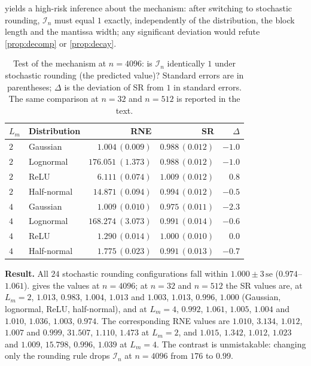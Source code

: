 \documentclass[twocolumn,review,hidelinks,oneeqnum,onetabnum,onefignum,onethmnum]{siamart251216}
\begin{document}
 yields a high-risk inference about the mechanism: after switching
to stochastic rounding, $\mathcal I_n$ must equal $1$ exactly, independently of
the distribution, the block length and the mantissa width; any significant
deviation would refute \cref{prop:decomp} or \cref{prop:decay}.

\begin{table}[!tb]
\centering
\caption{Test of the mechanism at $n=4096$: is $\mathcal I_n$ identically $1$
under stochastic rounding (the predicted value)? Standard errors are in
parentheses; $\Delta$ is the deviation of SR from $1$ in standard errors. The
same comparison at $n=32$ and $n=512$ is reported in the text.}
\label{tab:srfull}
\setlength{\tabcolsep}{4pt}
\footnotesize
\begin{tabular}{@{}llrrr@{}}
\toprule
$L_m$ & Distribution & RNE & SR & $\Delta$ \\
\midrule
$2$ & Gaussian    & $1.004\,(0.009)$ & $0.988\,(0.012)$ & $-1.0$ \\
$2$ & Lognormal   & $\mathbf{176.051}\ (1.373)$ & $\mathbf{0.988}\,(0.012)$ & $-1.0$ \\
$2$ & ReLU        & $\mathbf{6.111}\,(0.074)$ & $\mathbf{1.009}\,(0.012)$ & $0.8$ \\
$2$ & Half-normal & $\mathbf{14.871}\,(0.094)$ & $\mathbf{0.994}\,(0.012)$ & $-0.5$ \\
\midrule
$4$ & Gaussian    & $1.009\,(0.010)$ & $0.975\,(0.011)$ & $-2.3$ \\
$4$ & Lognormal   & $\mathbf{168.274}\ (3.073)$ & $\mathbf{0.991}\,(0.014)$ & $-0.6$ \\
$4$ & ReLU        & $1.290\,(0.014)$ & $1.000\,(0.010)$ & $0.0$ \\
$4$ & Half-normal & $1.775\,(0.023)$ & $0.991\,(0.013)$ & $-0.7$ \\
\bottomrule
\end{tabular}
\end{table}

\noindent\textbf{Result.} All $24$ stochastic rounding configurations fall within
$1.000\pm3\,\mathrm{se}$ ($0.974$--$1.061$).  gives the values at
$n=4096$; at $n=32$ and $n=512$ the SR values are, at $L_m=2$, $1.013$, $0.983$,
$1.004$, $1.013$ and $1.003$, $1.013$, $0.996$, $1.000$ (Gaussian, lognormal,
ReLU, half-normal), and at $L_m=4$, $0.992$, $1.061$, $1.005$, $1.004$ and
$1.010$, $1.036$, $1.003$, $0.974$. The corresponding RNE values are $1.010$,
$3.134$, $1.012$, $1.007$ and $0.999$, $31.507$, $1.110$, $1.473$ at $L_m=2$,
and $1.015$, $1.342$, $1.012$, $1.023$ and $1.009$, $15.798$, $0.996$, $1.039$ at
$L_m=4$. The contrast is unmistakable: changing only the rounding rule drops
$\mathcal I_n$ at $n=4096$ from $176$ to $0.99$.
\end{document}
